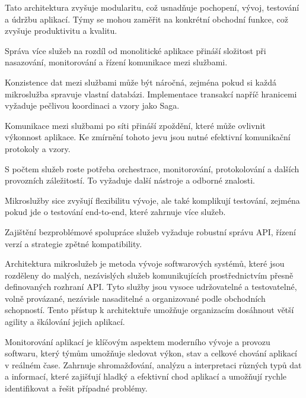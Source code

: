 
Tato architektura zvyšuje modularitu, což usnadňuje pochopení, vývoj, testování a údržbu aplikací. Týmy se mohou zaměřit na konkrétní obchodní funkce, což zvyšuje produktivitu a kvalitu.



Správa více služeb na rozdíl od monolitické aplikace přináší složitost při nasazování, monitorování a řízení komunikace mezi službami.


Konzistence dat mezi službami může být náročná, zejména pokud si každá mikroslužba spravuje vlastní databázi. Implementace transakcí napříč hranicemi vyžaduje pečlivou koordinaci a vzory jako Saga.


Komunikace mezi službami po síti přináší zpoždění, které může ovlivnit výkonnost aplikace. Ke zmírnění tohoto jevu jsou nutné efektivní komunikační protokoly a vzory.


S počtem služeb roste potřeba orchestrace, monitorování, protokolování a dalších provozních záležitostí. To vyžaduje další nástroje a odborné znalosti.


Mikroslužby sice zvyšují flexibilitu vývoje, ale také komplikují testování, zejména pokud jde o testování end-to-end, které zahrnuje více služeb.

 Zajištění bezproblémové spolupráce služeb vyžaduje robustní správu API, řízení verzí a strategie zpětné kompatibility.


Architektura mikroslužeb je metoda vývoje softwarových systémů, které jsou rozděleny do malých, nezávislých služeb komunikujících prostřednictvím přesně definovaných rozhraní API. Tyto služby jsou vysoce udržovatelné a testovatelné, volně provázané, nezávisle nasaditelné a organizované podle obchodních schopností. Tento přístup k architektuře umožňuje organizacím dosáhnout větší agility a škálování jejich aplikací.


Monitorování aplikací je klíčovým aspektem moderního vývoje a provozu softwaru, který týmům umožňuje sledovat výkon, stav a celkové chování aplikací v reálném čase. Zahrnuje shromažďování, analýzu a interpretaci různých typů dat a informací, které zajišťují hladký a efektivní chod aplikací a umožňují rychle identifikovat a řešit případné problémy.

